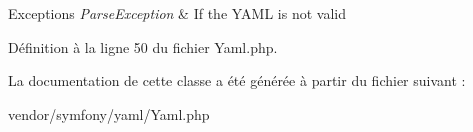 \begin{DoxyExceptions}{Exceptions}
{\em Parse\+Exception} & If the Y\+A\+ML is not valid \\
\hline
\end{DoxyExceptions}


Définition à la ligne 50 du fichier Yaml.\+php.



La documentation de cette classe a été générée à partir du fichier suivant \+:\begin{DoxyCompactItemize}
\item 
vendor/symfony/yaml/Yaml.\+php\end{DoxyCompactItemize}
